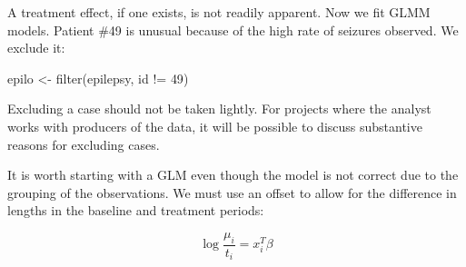 \documentclass[
  ignorenonframetext,
]{beamer}
\newenvironment{Shaded}{\begin{snugshade}}{\end{snugshade}}
\newcommand{\DecValTok}[1]{\textcolor[rgb]{0.00,0.00,0.81}{#1}}
\newcommand{\FunctionTok}[1]{\textcolor[rgb]{0.00,0.00,0.00}{#1}}
\newcommand{\NormalTok}[1]{#1}
\newcommand{\OtherTok}[1]{\textcolor[rgb]{0.56,0.35,0.01}{#1}}
\newcommand{\SpecialCharTok}[1]{\textcolor[rgb]{0.00,0.00,0.00}{#1}}
\begin{document}
\begin{frame}[fragile]{}
\protect\hypertarget{section-6}{}
A treatment effect, if one exists, is not readily apparent. Now we fit
GLMM models. Patient \#49 is unusual because of the high rate of
seizures observed. We exclude it:

\vspace{12pt}
\small

\begin{Shaded}
\begin{Highlighting}[]
\NormalTok{epilo }\OtherTok{\textless{}{-}} \FunctionTok{filter}\NormalTok{(epilepsy, id }\SpecialCharTok{!=} \DecValTok{49}\NormalTok{)}
\end{Highlighting}
\end{Shaded}

\vspace{12pt}
\normalsize

Excluding a case should not be taken lightly. For projects where the
analyst works with producers of the data, it will be possible to discuss
substantive reasons for excluding cases.

It is worth starting with a GLM even though the model is not correct due
to the grouping of the observations. We must use an offset to allow for
the difference in lengths in the baseline and treatment periods:

\[
\log\frac{\mu_i}{t_i} = x_i^T\beta
\]
\end{frame}
\end{document}
